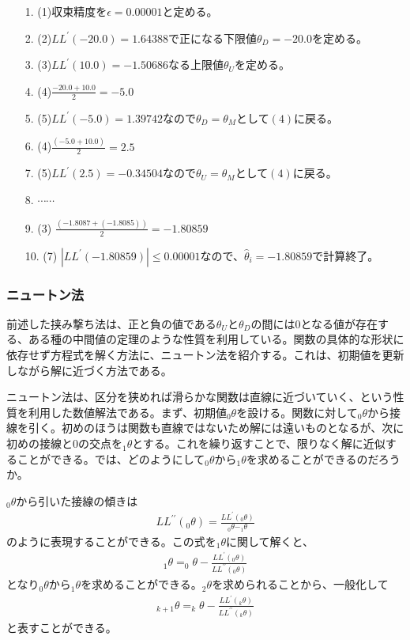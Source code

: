 \documentclass[12pt]{jarticle}
\begin{document}
\begin{itemize}
  \item[1.] (1)収束精度を$\displaystyle\epsilon = 0.00001$と定める。
  \item[2.] (2)$LL^{\prime}(-20.0) = 1.64388$で正になる下限値$\displaystyle\theta_D = -20.0$を定める。
  \item[3.] (3)$LL^{\prime}(10.0) = -1.50686$なる上限値$\displaystyle\theta_U$を定める。
  \item[4.] (4)$\displaystyle \frac{-20.0 + 10.0}{2} = -5.0$
  \item[5.] (5)$\displaystyle LL^{\prime}(-5.0) = 1.39742$なので$\displaystyle\theta_D=\theta_M$として$(4)$に戻る。
  \item[6.]  (4)$\displaystyle \frac{(-5.0 + 10.0)}{2} = 2.5$
  \item[7.] (5)$\displaystyle LL^{\prime}(2.5) = -0.34504$なので$\displaystyle\theta_U=\theta_M$として$(4)$に戻る。
  \item[8.] $\cdots$$\cdots$
  \item[9.] (3)  $\displaystyle \frac{(-1.8087 + (-1.8085))}{2} = -1.80859$
  \item[10.] (7) $\displaystyle |LL^{\prime}(-1.80859)| \leq 0.00001$なので、$\hat{\theta}_i = -1.80859$で計算終了。
\end{itemize}
\subsubsection{ニュートン法}
前述した挟み撃ち法は、正と負の値である$\theta_U$と$\theta_D$の間には$0$となる値が存在する、ある種の中間値の定理のような性質を利用している。関数の具体的な形状に依存せず方程式を解く方法に、ニュートン法を紹介する。これは、初期値を更新しながら解に近づく方法である。

ニュートン法は、区分を狭めれば滑らかな関数は直線に近づいていく、という性質を利用した数値解法である。まず、初期値$_{0}\theta$を設ける。関数に対して$_{0}\theta$から接線を引く。初めのほうは関数も直線ではないため解には遠いものとなるが、次に初めの接線と$0$の交点を$_{1}\theta$とする。これを繰り返すことで、限りなく解に近似することができる。では、どのようにして$_{0}\theta$から$_{1}\theta$を求めることができるのだろうか。

$_{0}\theta$から引いた接線の傾きは
\begin{align}
  \label{00}
  \displaystyle LL^{\prime\prime}(_{0}\theta) = \frac{LL^{\prime}(_{0}\theta)}{_{0}\theta - _{1}\theta} \tag{3.17}
\end{align}
のように表現することができる。この式を$_{1}\theta$に関して解くと、
\begin{align}
  \label{01}
  \displaystyle _{1}\theta = _{0}\theta - \frac{LL^{\prime}(_{0}\theta)}{LL^{\prime\prime}(_{0}\theta)} \tag{3.18}
\end{align}
となり$_{0}\theta$から$_{1}\theta$を求めることができる。$_{2}\theta$を求められることから、一般化して
\begin{align}
  \label{02}
  \displaystyle _{k+1}\theta = _{k}\theta - \frac{LL^{\prime}(_{k}\theta)}{LL^{\prime\prime}(_{k}\theta)} \tag{3.19}
\end{align}
と表すことができる。
\end{document}
